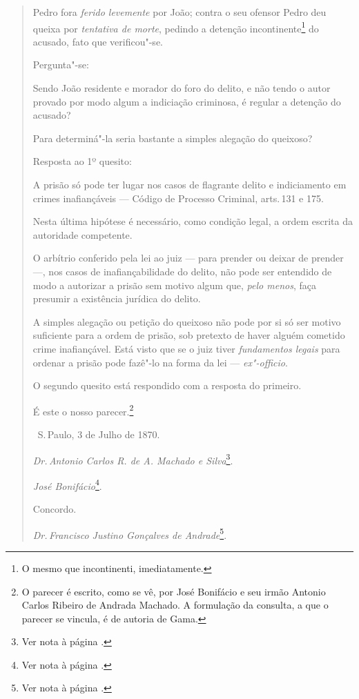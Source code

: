 \begin{quote}
Pedro fora \emph{ferido levemente} por João; contra o seu ofensor Pedro
deu queixa por \emph{tentativa de morte}, pedindo a detenção
incontinente\footnote{O mesmo que incontinenti, imediatamente.} do
acusado, fato que verificou"-se.

Pergunta"-se:

Sendo João residente e morador do foro do delito, e não tendo o autor
provado por modo algum a indiciação criminosa, é regular a detenção do
acusado?

Para determiná"-la seria bastante a simples alegação do queixoso?

Resposta ao 1º quesito:

A prisão só pode ter lugar nos casos de flagrante delito e indiciamento
em crimes inafiançáveis --- Código de Processo Criminal, arts.\,131 e
175.

Nesta última hipótese é necessário, como condição legal, a ordem escrita
da autoridade competente.

O arbítrio conferido pela lei ao juiz --- para prender ou deixar de
prender ---, nos casos de inafiançabilidade do delito, não pode ser
entendido de modo a autorizar a prisão sem motivo algum que, \emph{pelo
menos}, faça presumir a existência jurídica do delito.

A simples alegação ou petição do queixoso não pode por si só ser motivo
suficiente para a ordem de prisão, sob pretexto de haver alguém cometido
crime inafiançável. Está visto que se o juiz tiver \emph{fundamentos
legais} para ordenar a prisão pode fazê"-lo na forma da lei ---
\emph{ex"-officio}.

O segundo quesito está respondido com a resposta do primeiro.

É este o nosso parecer.\footnote{O parecer é escrito, como se vê, por
  José Bonifácio e seu irmão Antonio Carlos Ribeiro de Andrada Machado.
  A formulação da consulta, a que o parecer se vincula, é de autoria de
  Gama.}

\medskip

\hfill\ S.\,Paulo, 3 de Julho de 1870.\smallskip

\hfill\emph{Dr.\,Antonio Carlos R. de A. Machado e Silva}\footnote{Ver nota à página \pageref{machado}.}.

\hfill\emph{José Bonifácio}\footnote{Ver nota à página \pageref{bonifacio}.}.\bigskip

Concordo.

\qquad\emph{Dr.\,Francisco Justino Gonçalves de Andrade}\footnote{Ver nota à página \pageref{justino}.}.\bigskip


\end{quote}
